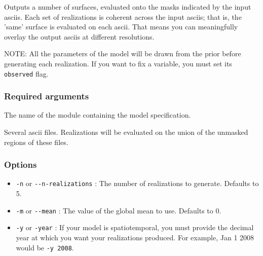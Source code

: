 Outputs a number of surfaces, evaluated onto the masks indicated by the input asciis. Each set
of realizations is coherent across the input asciis; that is, the 'same' surface is evaluated
on each ascii. That means you can meaningfully overlay the output asciis at different
resolutions.

NOTE: All the parameters of the model will be drawn from the prior before generating each
realization. If you want to fix a variable, you must set its \texttt{observed} flag.




\subsubsection{Required arguments%
}
\setcounter{listcnt0}{0}
\begin{list}{.}
{
\setlength{\rightmargin}{\leftmargin}
}

\item The name of the module containing the model specification.

\item Several ascii files. Realizations will be evaluated on the union of the unmasked regions
of these files.
\end{list}




\subsubsection{Options%
}
%
\begin{itemize}

\item \texttt{-n} or \texttt{-{}-n-realizations} : The number of realizations to generate. Defaults to 5.

\item \texttt{-m} or \texttt{-{}-mean} : The value of the global mean to use. Defaults to 0.

\item \texttt{-y} or \texttt{-year} : If your model is spatiotemporal, you must provide the decimal year at
which you want your realizations produced. For example, Jan 1 2008 would be \texttt{-y 2008}.

\end{itemize}
